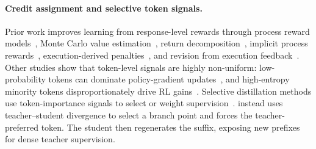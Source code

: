 \vspace{-0.1cm}\paragraph{Credit assignment and selective token signals.} Prior work improves learning from response-level rewards through process reward models~\citep{lightman2024verify,wang2024mathshepherd}, Monte Carlo value estimation~\citep{kazemnejad2024vineppo}, return decomposition~\citep{parthasarathi2025grpolambda}, implicit process rewards~\citep{cui2025prime}, execution-derived penalties~\citep{liu2023rltf}, and revision from execution feedback~\citep{gehring2025rlef}. Other studies show that token-level signals are highly non-uniform: low-probability tokens can dominate policy-gradient updates~\citep{yang2025lowprob}, and high-entropy minority tokens disproportionately drive RL gains~\citep{wang2025beyond8020}. Selective distillation methods use token-importance signals to select or weight supervision~\citep{xu2026tip,tavor2026rethinking,huang2026selectkd}. 
\method{} instead uses teacher–student divergence to select a branch point and forces the teacher-preferred token. The student then regenerates the suffix, exposing new prefixes for dense teacher supervision. 



























